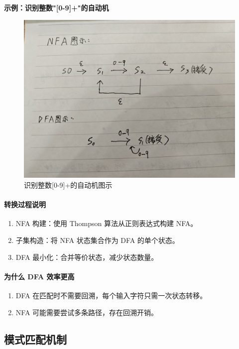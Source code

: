 \documentclass[twocolumn]{article}
\begin{document}
\noindent \textbf{示例：识别整数"[0-9]+"的自动机}
\begin{figure}[H]
    \centering
    \includegraphics[width=\linewidth]{example1.jpg}
    \caption{识别整数[0-9]+的自动机图示}
    \label{fig:example1}
\end{figure}
\paragraph{转换过程说明}
\begin{enumerate}
    \item NFA 构建：使用 Thompson 算法从正则表达式构建 NFA。
    \item 子集构造：将 NFA 状态集合作为 DFA 的单个状态。
    \item DFA 最小化：合并等价状态，减少状态数量。
\end{enumerate}

\paragraph{为什么 DFA 效率更高}
\begin{enumerate}
    \item DFA 在匹配时不需要回溯，每个输入字符只需一次状态转移。
    \item NFA 可能需要尝试多条路径，存在回溯开销。
\end{enumerate}

\subsection{模式匹配机制}
\end{document}
